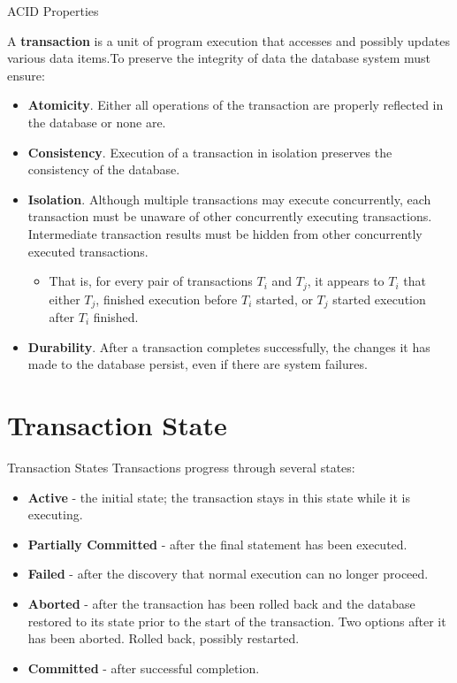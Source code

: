 \documentclass{beamer}
\begin{document}
\begin{frame}{ACID Properties}

    \scriptsize
    A \textbf{transaction} is a unit of program execution that accesses and possibly updates various data items.To preserve the integrity of data the database system must ensure:
        \begin{itemize}
            \item \textbf{Atomicity}. Either all operations of the transaction are properly reflected in the database or none are.
            \item \textbf{Consistency}. Execution of a transaction in isolation preserves the consistency of the database.
            \item \textbf{Isolation}. Although multiple transactions may execute concurrently, each transaction must be unaware of other concurrently executing transactions. Intermediate transaction results must be hidden from other concurrently executed transactions.
                \begin{itemize}
                    \scriptsize
                    \item That is, for every pair of transactions $T_i$ and $T_j$, it appears to $T_i$ that either $T_j$, finished execution before $T_i$ started, or $T_j$ started execution after $T_i$ finished.
                \end{itemize}
            \item \textbf{Durability}. After a transaction completes successfully, the changes it has made to the database persist, even if there are system failures.
        \end{itemize}

\end{frame}

\section{Transaction State}

\begin{frame}{Transaction States}
    Transactions progress through several states:
    \begin{itemize}
        \item \textbf{Active} - the initial state; the transaction stays in this state while it is executing.
        \item \textbf{Partially Committed} - after the final statement has been executed.
        \item \textbf{Failed} - after the discovery that normal execution can no longer proceed.
        \item \textbf{Aborted} - after the transaction has been rolled back and the database restored to its state prior to the start of the transaction. Two options after it has been aborted.  Rolled back, possibly restarted.
        \item \textbf{Committed} - after successful completion.
    \end{itemize}
\end{frame}
\end{document}
